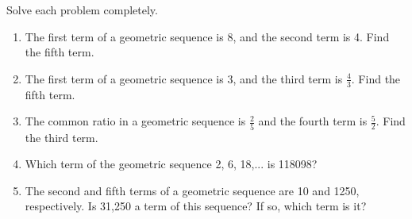 Solve each problem completely. 
	\begin{enumerate}[label = \arabic*. ]
	\item \hspce The first term of a geometric sequence is 8, and the second term is 4. Find the fifth term. 

	\item \hspce The first term of a geometric sequence is 3, and the third term is $\frac{4}{3}$. Find the fifth term. 

	\item \hspce The common ratio in a geometric sequence is $\frac{2}{5}$ and the fourth term is $\frac{5}{2}$. Find the third term. 

	\item \hspce Which term of the geometric sequence 2, 6, 18,... is 118098?
	\item \hspce The second and fifth terms of a geometric sequence are 10 and 1250, respectively.  Is 31,250 a term of this sequence? If so, which term is it?
	\end{enumerate}